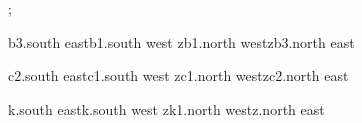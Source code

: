 ;

\bracetobrace
    {b3.south east}{b1.south west}
    {zb1.north west}{zb3.north east}

\bracetobrace
    {c2.south east}{c1.south west}
    {zc1.north west}{zc2.north east}

\bracetobrace
    {k.south east}{k.south west}
    {zk1.north west}{z.north east}
